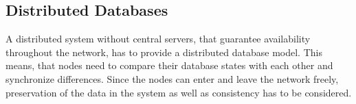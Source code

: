 \begin{figure}[!htb]
{		\label{figure:heartbeat coordinator}
	}%
	\hfill
\end{figure}

\subsection{Distributed Databases} \label{Distributed Database}

A distributed system without central servers, that guarantee availability throughout the network, has to provide a distributed database model. This means, that nodes need to compare their database states with each other and synchronize differences. Since the nodes can enter and leave the network freely, preservation of the data in the system as well as consistency has to be considered.

